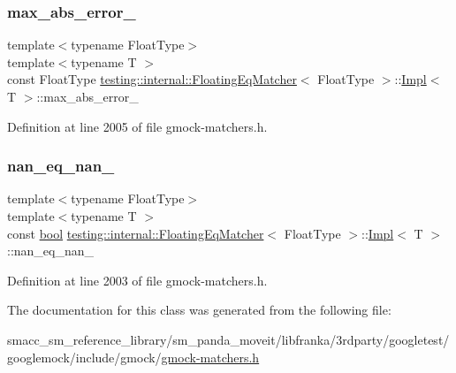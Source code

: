 \subsubsection{\texorpdfstring{max\+\_\+abs\+\_\+error\+\_\+}{max\_abs\_error\_}}
{\footnotesize\ttfamily template$<$typename Float\+Type$>$ \\
template$<$typename T $>$ \\
const Float\+Type \hyperlink{classtesting_1_1internal_1_1FloatingEqMatcher}{testing\+::internal\+::\+Floating\+Eq\+Matcher}$<$ Float\+Type $>$\+::\hyperlink{classtesting_1_1internal_1_1FloatingEqMatcher_1_1Impl}{Impl}$<$ T $>$\+::max\+\_\+abs\+\_\+error\+\_\+\hspace{0.3cm}{\ttfamily [private]}}



Definition at line 2005 of file gmock-\/matchers.\+h.

\mbox{\label{classtesting_1_1internal_1_1FloatingEqMatcher_1_1Impl_a77073561281e81e81ac8c870a0689e7a}} 
\subsubsection{\texorpdfstring{nan\+\_\+eq\+\_\+nan\+\_\+}{nan\_eq\_nan\_}}
{\footnotesize\ttfamily template$<$typename Float\+Type$>$ \\
template$<$typename T $>$ \\
const \hyperlink{classbool}{bool} \hyperlink{classtesting_1_1internal_1_1FloatingEqMatcher}{testing\+::internal\+::\+Floating\+Eq\+Matcher}$<$ Float\+Type $>$\+::\hyperlink{classtesting_1_1internal_1_1FloatingEqMatcher_1_1Impl}{Impl}$<$ T $>$\+::nan\+\_\+eq\+\_\+nan\+\_\+\hspace{0.3cm}{\ttfamily [private]}}



Definition at line 2003 of file gmock-\/matchers.\+h.



The documentation for this class was generated from the following file\+:\begin{DoxyCompactItemize}
\item 
smacc\+\_\+sm\+\_\+reference\+\_\+library/sm\+\_\+panda\+\_\+moveit/libfranka/3rdparty/googletest/googlemock/include/gmock/\hyperlink{gmock-matchers_8h}{gmock-\/matchers.\+h}\end{DoxyCompactItemize}
